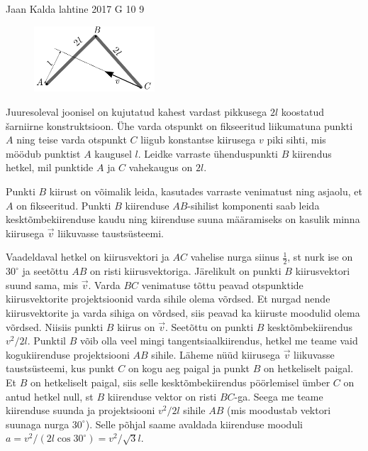 {Jaan Kalda} %
{lahtine} %
{2017} %
{G 10} %
{9} %
{
\ifStatement
\begin{figure}
	\vspace{-10pt}
	\includegraphics[width = 0.4\textwidth] {2017-lahg-10-delta.pdf}
\end{figure}

Juuresoleval joonisel on kujutatud kahest vardast pikkusega $2l$ koostatud \v sarniirne konstruktsioon. Ühe varda otspunkt on fikseeritud liikumatuna punkti $A$ ning teise varda otspunkt $C$ liigub konstantse kiirusega $v$ piki sihti, mis möödub punktist $A$ kaugusel $l$. Leidke varraste ühenduspunkti $B$ kiirendus hetkel, mil punktide $A$ ja $C$ vahekaugus on $2l$.
\fi


\ifHint
Punkti $B$ kiirust on võimalik leida, kasutades varraste venimatust ning asjaolu, et $A$ on fikseeritud. Punkti $B$ kiirenduse $AB$-sihilist komponenti saab leida kesktõmbekiirenduse kaudu ning kiirenduse suuna määramiseks on kasulik minna kiirusega $\vec{v}$ liikuvasse taustsüsteemi.
\fi


\ifSolution
Vaadeldaval hetkel on kiirusvektori ja $AC$ vahelise nurga siinus $\frac 12$, st nurk ise on $30^\circ$ ja seetõttu $AB$ on risti kiirusvektoriga. Järelikult on punkti $B$ kiirusvektori suund sama, mis $\vec v$. Varda $BC$ venimatuse tõttu peavad otspunktide kiirusvektorite projektsioonid varda sihile olema võrdsed. Et nurgad nende kiirusvektorite ja varda sihiga on võrdsed, siis peavad ka kiiruste moodulid olema võrdsed. Niisiis punkti $B$ kiirus on $\vec v$. Seetõttu on punkti $B$ kesktõmbekiirendus $v^2/2l$. Punktil $B$ võib olla veel mingi tangentsiaalkiirendus, hetkel me teame vaid kogukiirenduse projektsiooni $AB$ sihile. Läheme nüüd kiirusega $\vec v$ liikuvasse taustsüsteemi, kus punkt $C$ on kogu aeg paigal ja punkt $B$ on hetkeliselt paigal. Et $B$ on hetkeliselt paigal, siis selle kesktõmbekiirendus pöörlemisel ümber $C$ on antud hetkel null, st $B$ kiirenduse vektor on risti $BC$-ga. Seega me teame kiirenduse suunda ja projektsiooni $v^2/2l$ sihile $AB$ (mis moodustab vektori suunaga nurga $30^\circ$). Selle põhjal saame avaldada kiirenduse mooduli $a=v^2/(2l\cos30^\circ)=v^2/\sqrt 3l$.
\fi


}
